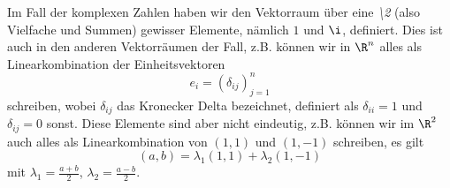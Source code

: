 Im Fall der komplexen Zahlen haben wir den Vektorraum über eine \emph{\textbackslash{}2} (also Vielfache und Summen) gewisser Elemente, nämlich \(1\) und \(\i\), definiert. Dies ist auch in den anderen Vektorräumen der Fall, z.B. können wir in \(\R^n\) alles als Linearkombination der Einheitsvektoren
\begin{equation*}
 e_i = (\delta_{ij})_{j=1}^n
\end{equation*}
schreiben, wobei \(\delta_{ij}\) das Kronecker Delta bezeichnet, definiert als \(\delta_{ii}=1\) und \(\delta_{ij}=0\) sonst. Diese Elemente sind aber nicht eindeutig, z.B. können wir im \(\R^2\) auch alles als Linearkombination von \((1,1)\) und \((1,-1)\) schreiben, es gilt
\begin{equation*}
 (a,b) = \lambda_1 (1,1) + \lambda_2 (1,-1)
\end{equation*}
mit \(\lambda_1 = \frac{a+b}2\), \(\lambda_2 = \frac{a-b}2\).
\label{vektorraeume/vektorraeume:definition-5}
